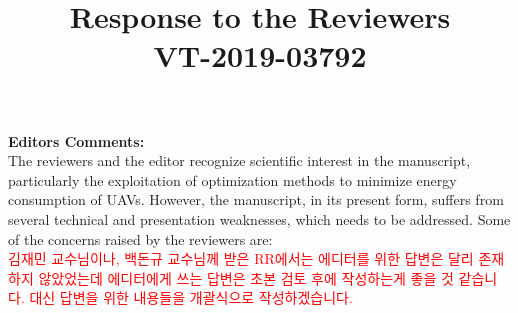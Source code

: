 \documentclass[onecolumn]{IEEEconf}
\title{Response to the Reviewers\\VT-2019-03792}
\begin{document}
\maketitle

\setlength{\parindent}{0cm}
\textbf{\large Editors Comments:}\\
The reviewers and the editor recognize scientific interest in the manuscript, particularly the exploitation of optimization methods to minimize energy consumption of UAVs. However, the manuscript, in its present form, suffers from several technical and presentation weaknesses, which needs to be addressed. 
Some of the concerns raised by the reviewers are:~\\
\textcolor{red}{김재민 교수님이나, 백돈규 교수님께 받은 RR에서는 에디터를 위한 답변은 달리 존재 하지 않았었는데 에디터에게 쓰는 답변은 초본 검토 후에 작성하는게 좋을 것 같습니다. 대신 답변을 위한 내용들을 개괄식으로 작성하겠습니다.}
\end{document}
